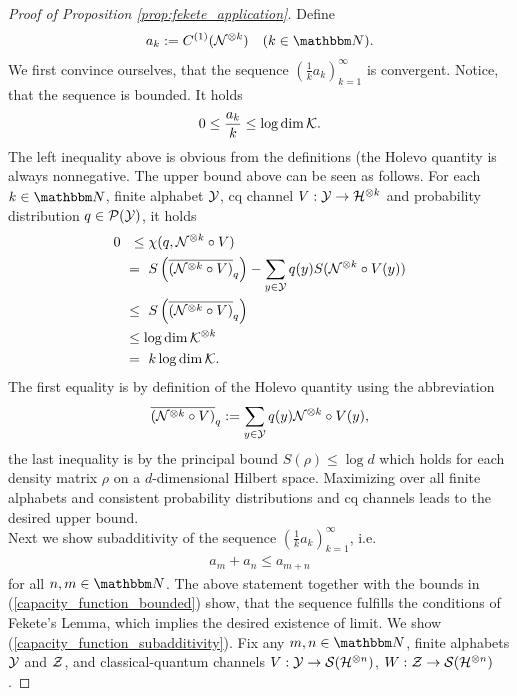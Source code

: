      \begin{proof}[Proof of Proposition \ref{prop:fekete_application}]
	 Define 
	\begin{align}
	a_k := C^{(1)}(\cN^{\otimes k}) && (k \in \bbmN).
	\end{align}
	We first convince ourselves, that the sequence $(\tfrac{1}{k}a_k)_{k=1}^\infty$ is convergent. Notice, that the sequence is bounded. It holds
	\begin{align}
	0 \leq \frac{a_k}{k} \leq  \log \dim {\mathcal K}.  \label{capacity_function_bounded}
	\end{align}
	The left inequality above is obvious from the definitions (the Holevo quantity is always nonnegative. The upper bound above can be seen as follows. For each $k \in \bbmN$, finite alphabet ${\mathcal Y}$, cq channel
	$V: {\mathcal Y} \rightarrow {\mathcal H}^{\otimes k}$  and probability distribution $q \in {\mathcal P}({\mathcal Y})$, it holds 
	\begin{align*}
	0 
	\ &  \ \leq \chi(q, {\mathcal N}^{\otimes k}\circ V) \\
	\ & =  \ S\left(\overline{({\mathcal N}^{\otimes k}\circ V)}_q\right) - \sum_{y \in {\mathcal Y}} q(y) S({\mathcal N}^{\otimes k} \circ V(y)) \\
	\ & \leq \ S\left(\overline{({\mathcal N}^{\otimes k}\circ V)}_q\right) \\
	\ & \leq \log \dim {\mathcal K}^{\otimes k}  \\
	\ & = \ k \log \dim {\mathcal K}.
	\end{align*}
	The first equality is by definition of the Holevo quantity using the abbreviation
	\begin{align}
	\overline{({\mathcal N}^{\otimes k}\circ V)}_q := \sum_{y \in {\mathcal Y}} q(y) {\mathcal N}^{\otimes k} \circ V(y),
	\end{align}
	the last inequality is by the principal bound $S(\rho) \leq \log d$ which holds for each density matrix $\rho$ on a $d$-dimensional Hilbert space. Maximizing over all finite alphabets and consistent probability 
	distributions and cq channels leads to the desired upper bound. \\
	Next we show subadditivity of the sequence $(\tfrac{1}{k} a_k)_{k=1}^\infty$, i.e. 
	\begin{align}
	a_m + a_n \leq a_{m+n} \label{capacity_function_subadditivity}
	\end{align}
	for all $n,m \in \bbmN$. The above statement together with the bounds in (\ref{capacity_function_bounded}) show, that the sequence fulfills the conditions of Fekete's Lemma, which implies the desired existence of 
	limit. We show (\ref{capacity_function_subadditivity}). Fix any $m,n \in \bbmN$, finite alphabets ${\mathcal Y}$ and ${\mathcal Z}$, and classical-quantum channels $V: {\mathcal Y} \rightarrow {\mathcal S}({\mathcal H}^{\otimes n})$, $W: {\mathcal Z} \rightarrow {\mathcal S}({\mathcal H}^{\otimes n})$.

\end{proof}
